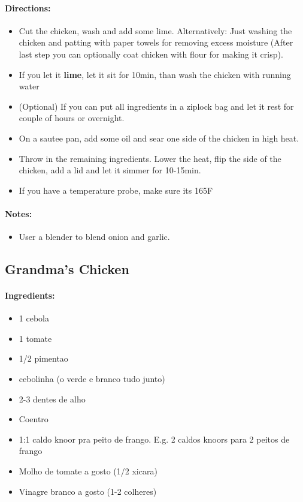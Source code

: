 \documentclass{article}
\begin{document}
\paragraph{Directions:}
\begin{itemize}
    \item Cut the chicken, wash and add some lime. Alternatively: Just washing the chicken and patting with paper towels for removing excess moisture (After last step you can optionally coat chicken with flour for making it crisp).
    \item If you let it \textbf{lime}, let it sit for 10min, than wash the chicken with running water
    \item (Optional) If you can put all ingredients in a ziplock bag and let it rest for couple of hours or overnight.
    \item On a sautee pan, add some oil and sear one side of the chicken in high heat.
    \item Throw in the remaining ingredients. Lower the heat, flip the side of the chicken, add a lid and let it simmer for 10-15min.
    \item If you have a temperature probe, make sure its 165F
\end{itemize}

\paragraph{Notes:}
\begin{itemize}
    \item User a blender to blend onion and garlic.
\end{itemize}

\subsection{Grandma’s Chicken}

\paragraph{Ingredients:}
\begin{itemize}
    \item 1 cebola
    \item 1 tomate
    \item 1/2 pimentao
    \item cebolinha (o verde e branco tudo junto)
    \item 2-3 dentes de alho
    \item Coentro
    \item 1:1 caldo knoor pra peito de frango. E.g. 2 caldos knoors para 2 peitos de frango
    \item Molho de tomate a gosto (1/2 xicara)
    \item Vinagre branco a gosto (1-2 colheres)
\end{itemize}
\end{document}
